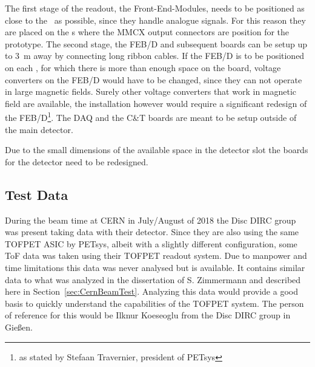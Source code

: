 \documentclass[../BTOF_summary.tex]{subfiles}
\begin{document}
The first stage of the readout, the Front-End-Modules, needs to be positioned as close to the \sipms\ as possible, since they handle analogue signals.
For this reason they are placed on the \railboard s where the MMCX output connectors are position for the prototype.
The second stage, the FEB/D and subsequent boards can be setup up to \SI{3}{m} away by connecting long ribbon cables.
If the FEB/D is to be positioned on each \sm , for which there is more than enough space on the board, voltage converters on the FEB/D would have to be changed, since they can not operate in large magnetic fields.
Surely other voltage converters that work in magnetic field are available, the installation however would require a significant redesign of the FEB/D\footnote{as stated by Stefaan Travernier, president of PETsys}.
The DAQ and the C\&T boards are meant to be setup outside of the main detector.

Due to the small dimensions of the available space in the detector slot the boards for the detector need to be redesigned.

\subsection{Test Data}

During the beam time at CERN in July/August of 2018 the Disc DIRC group was present taking data with their detector.
Since they are also using the same TOFPET ASIC by PETsys, albeit with a slightly different configuration, some ToF data was taken using their TOFPET readout system.
Due to manpower and time limitations this data was never analysed but is available.
It contains similar data to what was analyzed in the dissertation of S. Zimmermann and described here in Section~\ref{sec:CernBeamTest}.
Analyzing this data would provide a good basis to quickly understand the capabilities of the TOFPET system.
The person of reference for this would be Ilknur Koeseoglu from the Disc DIRC group in Gießen.
\end{document}
